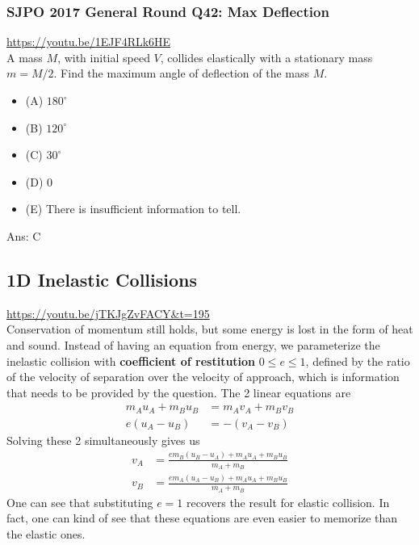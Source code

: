 \documentclass{article}
\begin{document}
\subsubsection{SJPO 2017 General Round Q42: Max Deflection}
\url{https://youtu.be/1EJF4RLk6HE}\\
A mass $M$, with initial speed $V$, collides elastically with a stationary mass $m=M / 2$. Find the maximum angle of deflection of the mass $M$.
\begin{itemize}
\item[] (A) $180^{\circ}$
\item[] (B) $120^{\circ}$
\item[] (C) $30^{\circ}$
\item[] (D) 0
\item[] (E) There is insufficient information to tell.
\end{itemize}
Ans: \ifpaper C \fi
\subsection{1D Inelastic Collisions}
\url{https://youtu.be/jTKJgZvFACY&t=195}\\
Conservation of momentum still holds, but some energy is lost in the form of heat and sound. Instead of having an equation from energy, we parameterize the inelastic collision with \textbf{coefficient of restitution} $0\leq e \leq 1$, defined by the ratio of the velocity of separation over the velocity of approach, which is information that needs to be provided by the question. The 2 linear equations are 
\begin{align}
    m_A u_A + m_B u_B &= m_A v_A + m_B v_B \\
    e (u_A - u_B) &= -(v_A - v_B)
\end{align}
Solving these 2 simultaneously gives us
\begin{align}
    v_A &= \frac{e m_B (u_B - u_A) + m_A u_A + m_B u_B}{m_A + m_B} \\
    v_B &= \frac{e m_A (u_A - u_B) + m_A u_A + m_B u_B}{m_A + m_B}
\end{align}
One can see that substituting $e=1$ recovers the result for elastic collision. In fact, one can kind of see that these equations are even easier to memorize than the elastic ones. 
\end{document}
